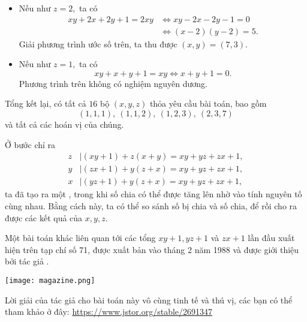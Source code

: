 \begin{gbtt}
{\begin{enumerate}
\begin{itemize}
        Giải phương trình ước số trên, ta thu được $(x,y)=(7,2),$ mâu thuẫn với giả sử $y\ge z.$
        \item {} Nếu như $z=2,$ ta có
        \begin{align*}
            xy+2x+2y+1=2xy&\Leftrightarrow xy-2x-2y-1=0\\&\Leftrightarrow (x-2)(y-2)=5.
        \end{align*}
        Giải phương trình ước số trên, ta thu được $(x,y)=(7,3).$    
        \item {} Nếu như $z=1,$ ta có
        $$xy+x+y+1=xy\Leftrightarrow x+y+1=0.$$
        Phương trình trên không có nghiệm nguyên dương.    
    \end{itemize}
\end{enumerate}
Tổng kết lại, có tất cả $16$ bộ $(x,y,z)$ thỏa yêu cầu bài toán, bao gồm $$(1,1,1),\ (1,1,2),\ (1,2,3),\ (2,3,7)$$ và tất cả các hoán vị của chúng.}
\begin{luuy}
Ở bước chỉ ra
\begin{align*}
    z&\mid (xy+1)+z(x+y)=xy+yz+zx+1,\\
    y&\mid (zx+1)+y(z+x)=xy+yz+zx+1,\\
    x&\mid (yz+1)+y(z+x)=xy+yz+zx+1,
\end{align*}
ta đã tạo ra một , trong khi số chia có thể được tăng lên nhờ vào tính nguyên tố cùng nhau. Bằng cách này, ta có thể so sánh số bị chia và số chia, để rồi cho ra được các kết quả của $x,y,z.$
\end{luuy}
\end{gbtt}

\begin{light}
Một bài toán khác liên quan tới các tổng $xy+1,yz+1$ và $zx+1$ lần đầu xuất hiện trên tạp chí  số 71, được xuất bản vào tháng 2 năm 1988 và được giới thiệu bởi tác giả .
\begin{center}
    \texttt{[image: magazine.png]}
\end{center}
Lời giải của tác giả cho bài toán này vô cùng tinh tế và thú vị, các bạn có thể tham khảo ở đây:
\url{https://www.jstor.org/stable/2691347}
\end{light}

